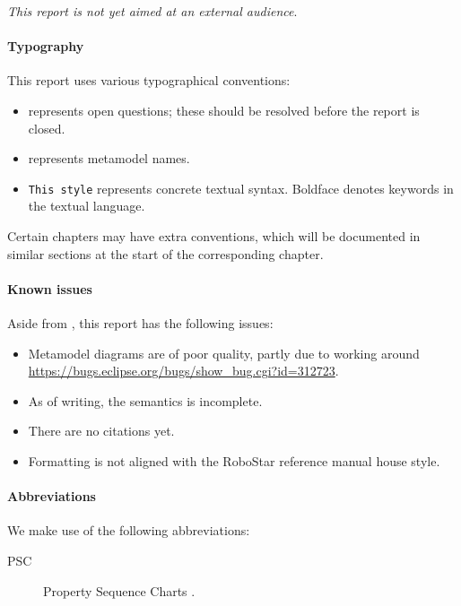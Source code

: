 
\emph{This report is not yet aimed at an external audience}.

\paragraph{Typography}
This report uses various typographical conventions:

\begin{itemize}
\item
	 represents open questions; these should be
	resolved before the report is closed.
\item
	 represents metamodel names.
\item
	\texttt{This style} represents concrete textual syntax.  Boldface
	denotes keywords in the textual language.
\end{itemize}

Certain chapters may have extra conventions, which will be documented in
similar sections at the start of the corresponding chapter.


\paragraph{Known issues}
Aside from , this report has the following issues:

\begin{itemize}
\item
	Metamodel diagrams are of poor quality, partly due to working around
	\url{https://bugs.eclipse.org/bugs/show_bug.cgi?id=312723}.
\item
	As of writing, the semantics is incomplete.
\item
	There are no citations yet.	
\item
	Formatting is not aligned with the RoboStar reference manual house
	style.
\end{itemize}

\paragraph{Abbreviations} We make use of the following abbreviations:

\begin{description}
	\item[PSC] Property Sequence Charts .
\end{description}
